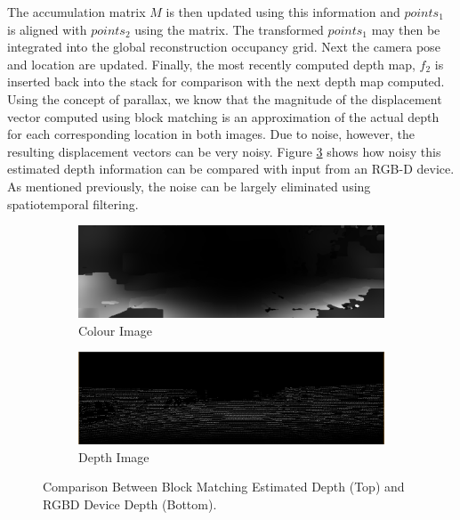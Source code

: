 The accumulation matrix $M$ is then updated using this information and $points_1$ is aligned with $points_2$ using the matrix. The transformed $points_1$ may then be integrated into the global reconstruction occupancy grid. Next the camera pose and location are updated. Finally, the most recently computed depth map, $f_2$ is inserted back into the stack for comparison with the next depth map computed. \\ 

Using the concept of parallax, we know that the magnitude of the displacement vector computed using block matching is an approximation of the actual depth for each corresponding location in both images. Due to noise, however, the resulting displacement vectors can be very noisy. Figure \ref{fig:DepthGenerationExample} shows how noisy this estimated depth information can be compared with input from an RGB-D device. As mentioned previously, the noise can be largely eliminated using spatiotemporal filtering. \\

\begin{figure}[!htb] 
        \centering
        \begin{subfigure}[b]{5.0in}
                \includegraphics[width=5.0in]{images/methodology/FVR/mono/depth}
                \caption{Colour Image}
                \label{fig:COLEXAMPLE}
        \end{subfigure}
        \begin{subfigure}[b]{5.0in}
                \includegraphics[width=5.0in]{images/methodology/FVR/mono/colorinv}
                \caption{Depth Image}
                \label{fig:DEPTHEXAMPLE}
        \end{subfigure}
       \caption{Comparison Between Block Matching Estimated Depth (Top) and RGBD Device Depth (Bottom).}
       \label{fig:DepthGenerationExample}
\end{figure}



